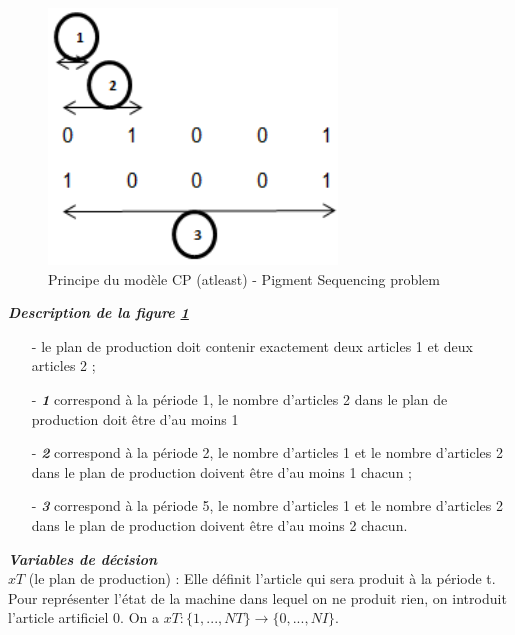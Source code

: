 \documentclass[12pt,a4paper]{article}
\begin{document}
		\begin{figure}[h]
		\begin{center}
			\includegraphics[scale=.5]{img/cp_modele_figure.png}
			\caption{Principe du modèle CP (atleast) - Pigment Sequencing problem}
			\label{fig:cp_modele_figure}
		\end{center}
		\end{figure}
		
		\textsl{\textbf{Description de la figure \ref{fig:cp_modele_figure}}} \\
		\begin{itemize}
			\item[-] le plan de production doit contenir exactement deux articles 1 et deux
articles 2 ;
			\item[-] \textbf{\emph{1}} correspond à la période 1, le nombre d’articles 2 dans le plan de production doit être d’au moins 1 
			\item[-] \textbf{\emph{2}} correspond à la période 2, le nombre d’articles 1 et le nombre d’articles 2 dans le plan de production doivent être d’au moins 1 chacun ;
			\item[-] \textbf{\emph{3}} correspond à la période 5, le nombre d’articles 1 et le nombre d’articles 2 dans le plan de production doivent être d’au moins 2 chacun.
		\end{itemize}
		
		\vspace*{.5cm}
		\textsl{\textbf{Variables de décision}} \\
		
		$xT$ (le plan de production) : Elle définit l’article qui sera produit à la période t. Pour représenter l’état de la machine dans lequel on ne produit rien, on introduit l’article artificiel 0. On a $xT : \{1, ..., N T\} \rightarrow \{0, ..., NI\}$. \\
		
\end{document}
